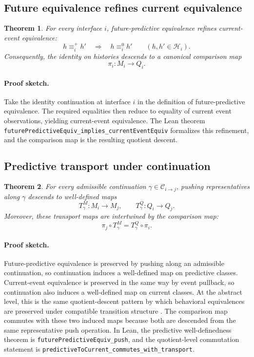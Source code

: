 \documentclass[11pt]{article}
\newcommand{\CurrentQ}{Q}
\newcommand{\PredictiveQ}{M}
\newcommand{\Histories}{\mathcal{H}}
\newcommand{\CurrentEquiv}{\equiv^{0}}
\newcommand{\FutureEquiv}{\equiv^{+}}
\newtheorem{theorem}{Theorem}[section]
\theoremstyle{definition}
\begin{document}
\subsection{Future equivalence refines current equivalence}\label{subsec:thm-refinement}
\begin{theorem}\label{thm:future-refines-current}
For every interface $i$, future-predictive equivalence refines current-event equivalence:
\[
h \FutureEquiv_i h'
\quad\Longrightarrow\quad
h \CurrentEquiv_i h'
\qquad
(h,h'\in\Histories_i).
\]
Consequently, the identity on histories descends to a canonical comparison map
\[
\pi_i : \PredictiveQ_i \to \CurrentQ_i.
\]
\end{theorem}

\paragraph{Proof sketch.}
Take the identity continuation at interface $i$ in the definition of future-predictive equivalence. The required equalities then reduce to equality of current event observations, yielding current-event equivalence. The Lean theorem \texttt{futurePredictiveEquiv\_implies\_currentEventEquiv} formalizes this refinement, and the comparison map is the resulting quotient descent.

\subsection{Predictive transport under continuation}\label{subsec:thm-transport}
\begin{theorem}\label{thm:predictive-transport}
For every admissible continuation $\gamma\in\mathcal{C}_{i\to j}$, pushing representatives along $\gamma$ descends to well-defined maps
\[
T^{\PredictiveQ}_{\gamma} : \PredictiveQ_i \to \PredictiveQ_j,
\qquad
T^{\CurrentQ}_{\gamma} : \CurrentQ_i \to \CurrentQ_j.
\]
Moreover, these transport maps are intertwined by the comparison map:
\[
\pi_j \circ T^{\PredictiveQ}_{\gamma}
=
T^{\CurrentQ}_{\gamma} \circ \pi_i.
\]
\end{theorem}

\paragraph{Proof sketch.}
Future-predictive equivalence is preserved by pushing along an admissible continuation, so continuation induces a well-defined map on predictive classes. Current-event equivalence is preserved in the same way by event pullback, so continuation also induces a well-defined map on current classes. At the abstract level, this is the same quotient-descent pattern by which behavioral equivalences are preserved under compatible transition structure \citep{Milner1989CommunicationConcurrency,LarsenSkou1991BisimulationThroughProbabilisticTesting}. The comparison map commutes with these two induced maps because both are descended from the same representative push operation. In Lean, the predictive well-definedness theorem is \texttt{futurePredictiveEquiv\_push}, and the quotient-level commutation statement is \texttt{predictiveToCurrent\_commutes\_with\_transport}.
\end{document}
